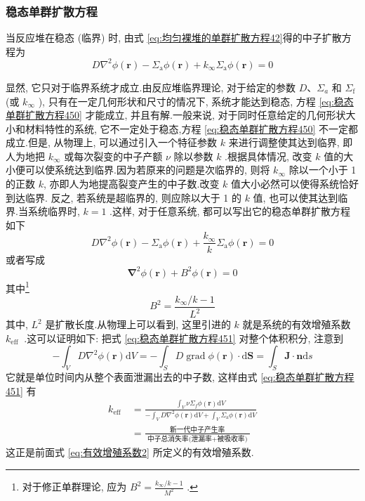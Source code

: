 \documentclass{Sichuan Normal University}
\begin{document}
\subsubsection{稳态单群扩散方程}\label{sec:稳态单群扩散方程}
当反应堆在稳态 (临界) 时, 由式 \eqref{eq:均匀裸堆的单群扩散方程42}得的中子扩散方程为
\begin{equation}
D \nabla^2 \phi(\boldsymbol{r})-\Sigma_{\mathrm{a}} \phi(\boldsymbol{r})+k_{\infty} \Sigma_{\mathrm{a}} \phi(\boldsymbol{r})=0
\label{eq:稳态单群扩散方程450}
\end{equation}

显然, 它只对于临界系统才成立.由反应堆临界理论, 对于给定的参数 $D 、 \Sigma_{a}$ 和 $\Sigma_{\mathrm{f}}$ (或 $k_{\infty}$ ), 只有在一定几何形状和尺寸的情况下, 系统才能达到稳态, 方程 \eqref{eq:稳态单群扩散方程450} 才能成立, 并且有解.一般来说, 对于同时任意给定的几何形状大小和材料特性的系统, 它不一定处于稳态,方程 \eqref{eq:稳态单群扩散方程450} 不一定都成立.但是, 从物理上, 可以通过引入一个特征参数 $k$ 来进行调整使其达到临界, 即人为地把 $k_{\infty}$ 或每次裂变的中子产额 $\nu$ 除以参数 $k$ .根据具体情况, 改变 $k$ 值的大小便可以使系统达到临界.因为若原来的问题是次临界的, 则将 $k_{\infty}$ 除以一个小于 1 的正数 $k$, 亦即人为地提高裂变产生的中子数.改变 $k$ 值大小必然可以使得系统恰好到达临界.
反之, 若系统是超临界的, 则应除以大于 1 的 $k$ 值, 也可以使其达到临界.当系统临界时, $k=1$ .这样, 对于任意系统, 都可以写出它的稳态单群扩散方程如下
\begin{equation}
D \nabla^2 \phi(\boldsymbol{r})-\Sigma_{\mathrm{a}} \phi(\boldsymbol{r})+\frac{k_{\infty}}{k} \Sigma_{\mathrm{a}} \phi(\boldsymbol{r})=0
\label{eq:稳态单群扩散方程451}
\end{equation}
或者写成
\begin{equation}
\boldsymbol{\nabla}^2 \phi(\boldsymbol{r})+B^2 \phi(\boldsymbol{r})=0
\label{eq:均匀裸堆稳态单群扩散方程}
\end{equation}其中\footnote{对于修正单群理论, 应为 $B^2=\frac{k_{\infty} / k-1}{M^2}$ .}
\begin{equation}
B^2=\frac{k_{\infty} / k-1}{L^2}
\end{equation}
其中, $L^2$ 是扩散长度.从物理上可以看到, 这里引进的 $k$ 就是系统的有效增殖系数 $k_{\text {eff }}$ .这可以证明如下: 把式 \eqref{eq:稳态单群扩散方程451} 对整个体积积分, 注意到
\begin{equation}
-\int_V D \nabla^2 \phi(\boldsymbol{r}) \mathrm{d} V=-\int_S D \operatorname{grad} \phi(\boldsymbol{r}) \cdot \mathrm{d} \boldsymbol{S}=\int_S \boldsymbol{J} \cdot \boldsymbol{n} \mathrm{d} s
\end{equation}
它就是单位时间内从整个表面泄漏出去的中子数, 这样由式 \eqref{eq:稳态单群扩散方程451} 有
\begin{equation}
\begin{aligned}
k_{\text {eff }} & =\frac{\int_V \nu \Sigma_f \phi(\boldsymbol{r}) \mathrm{d} V}{-\int_V D \nabla^2 \phi(\boldsymbol{r}) \mathrm{d} V+\int_V \Sigma_{\mathrm{a}} \phi(\boldsymbol{r}) \mathrm{d} V} \\
& =\frac{\text { 新一代中子产生率 }}{\text { 中子总消失率(泄漏率+被吸收率) }}
\end{aligned}
\end{equation}
这正是前面式 \eqref{eq:有效增殖系数2} 所定义的有效增殖系数.
\end{document}
